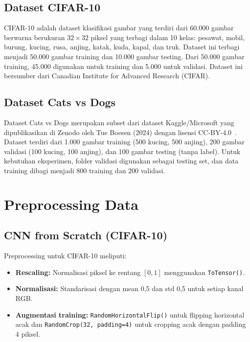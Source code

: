\documentclass[conference]{IEEEtran}
\begin{document}
\subsection{Dataset CIFAR-10}
CIFAR-10 adalah dataset klasifikasi gambar yang terdiri dari 60.000 gambar berwarna berukuran $32 \times 32$ piksel yang terbagi dalam 10 kelas: pesawat, mobil, burung, kucing, rusa, anjing, katak, kuda, kapal, dan truk. Dataset ini terbagi menjadi 50.000 gambar training dan 10.000 gambar testing. Dari 50.000 gambar training, 45.000 digunakan untuk training dan 5.000 untuk validasi. Dataset ini bersumber dari Canadian Institute for Advanced Research (CIFAR).

\subsection{Dataset Cats vs Dogs}
Dataset Cats vs Dogs merupakan subset dari dataset Kaggle/Microsoft yang dipublikasikan di Zenodo oleh Tue Boesen (2024) dengan lisensi CC-BY-4.0~\cite{zenodo_catsdogs}. Dataset terdiri dari 1.000 gambar training (500 kucing, 500 anjing), 200 gambar validasi (100 kucing, 100 anjing), dan 100 gambar testing (tanpa label). Untuk kebutuhan eksperimen, folder validasi digunakan sebagai testing set, dan data training dibagi menjadi 800 training dan 200 validasi.

\section{Preprocessing Data}
\subsection{CNN from Scratch (CIFAR-10)}
Preprocessing untuk CIFAR-10 meliputi:
\begin{itemize}
	\item \textbf{Rescaling:} Normalisasi piksel ke rentang $[0,1]$ menggunakan \texttt{ToTensor()}.
	\item \textbf{Normalisasi:} Standarisasi dengan mean 0,5 dan std 0,5 untuk setiap kanal RGB.
	\item \textbf{Augmentasi training:} \texttt{RandomHorizontalFlip()} untuk flipping horizontal acak dan \texttt{RandomCrop(32, padding=4)} untuk cropping acak dengan padding 4 piksel.
\end{itemize}
\end{document}
